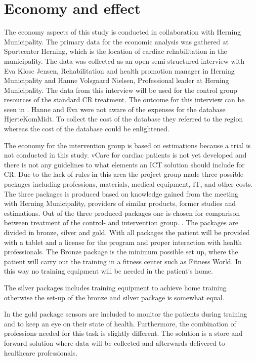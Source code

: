 \section{Economy and effect}

The economy aspects of this study is conducted in collaboration with Herning Municipality. The primary data for the economic analysis was gathered at Sportcenter Herning, which is the location of cardiac rehabilitation in the municipality. The data was collected as an open semi-structured interview with Eva Klose Jensen, Rehabilitation and health promotion manager in Herning Municipality and Hanne Volsgaard Nielsen, Professional leader at Herning Municipality. The data from this interview will be used for the control group resources of the standard CR treatment. The outcome for this interview can be seen in . Hanne and Eva were not aware of the expenses for the database HjerteKomMidt. To collect the cost of the database they referred to the region whereas the cost of the database could be enlightened\cite{hjerteKomMidt}.

The economy for the intervention group is based on estimations because a trial is not conducted in this study. vCare for cardiac patients is not yet developed and there is not any guidelines to what elements an ICT solution should include for CR. Due to the lack of rules in this area the project group made three possible packages including professions, materials, medical equipment, IT, and other costs. The three packages is produced based on knowledge gained from the meeting with Herning Municipality, providers of similar products, former studies and estimations. Out of the three produced packages one is chosen for comparison between treatment of the control- and intervention group.
. 
The packages are divided in bronze, silver and gold. With all packages the patient will be provided with a tablet and a license for the program and proper interaction with health professionals. 
The Bronze package is the minimum possible set up, where the patient will carry out the training in a fitness center such as Fitness World. In this way no training equipment will be needed in the patient’s home. 

The silver packages includes training equipment to achieve home training otherwise the set-up of the bronze and silver package is somewhat equal. 

In the gold package sensors are included to monitor the patients during training and to keep an eye on their state of health. Furthermore, the combination of professions needed for this task is slightly different. The solution is a store and forward solution where data will be collected and afterwards delivered to healthcare professionals.  

